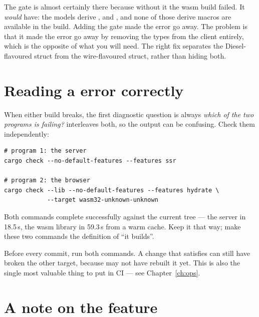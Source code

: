\begin{why}
The gate is almost certainly there because without it the wasm build failed. It \emph{would} have:
the models derive ,  and , and none of those
derive macros are available in the  build. Adding the gate made the error go away.
The problem is that it made the error go away by removing the types from the client entirely,
which is the opposite of what you will need. The right fix separates the Diesel-flavoured struct
from the wire-flavoured struct, rather than hiding both.
\end{why}

\section{Reading a  error correctly}

When either build breaks, the first diagnostic question is always \emph{which of the two programs
is failing?}  interleaves both, so the output can be confusing. Check them
independently:

\begin{lstlisting}[style=sh]
# program 1: the server
cargo check --no-default-features --features ssr

# program 2: the browser
cargo check --lib --no-default-features --features hydrate \
            --target wasm32-unknown-unknown
\end{lstlisting}

\begin{verified}
Both commands complete successfully against the current tree --- the server in 18.5\,s, the wasm
library in 59.3\,s from a warm cache. Keep it that way; make these two commands the definition of
``it builds''.
\end{verified}

\begin{pattern}
Before every commit, run both commands. A change that satisfies  can
still have broken the other target, because \code{watch} may not have rebuilt it yet. This is also
the single most valuable thing to put in CI --- see Chapter~\ref{ch:ops}.
\end{pattern}

\section{A note on the  feature}

